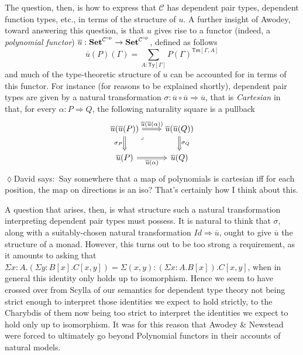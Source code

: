 \documentclass[
  11pt,
  oneside,
  article]{memoir}
\theoremstyle{definition}
\theoremstyle{plain}
\newcommand{\Cat}[1]{\mathbf{#1}}%
\newcommand{\op}{^\tn{op}}
\newcommand{\tn}[1]{\textnormal{#1}}
\newcommand{\smset}{\Cat{Set}}
\newcommand{\0}{\textsf{0}}
\newcommand{\1}{\tn{\textsf{1}}}
\newcommand{\dnote}[1]{{\quad \color{blue}$\lozenge$\;David says:}~#1\;{\color{blue}$\lozenge$}\quad}
\begin{document}
The question, then, is how to express that \(\mathcal{C}\) has dependent
pair types, dependent function types, etc., in terms of the structure of
\(u\). A further insight of Awodey, toward answering this question, is
that \(u\) gives rise to a functor (indeed, a \emph{polynomial functor})
\(\overline{u} : \smset^{\mathcal{C}\op} \to \smset^{\mathcal{C}\op}\),
defined as follows \[
\overline{u}(P)(\Gamma) = \sum_{A : \mathsf{Ty}[\Gamma]} P(\Gamma)^{\mathsf{Tm}[\Gamma, A]}
\] and much of the type-theoretic structure of \(u\) can be accounted
for in terms of this functor. For instance (for reasons to be explained
shortly), dependent pair types are given by a natural transformation
\(\sigma : \overline{u} \circ \overline{u} \Rightarrow \overline{u}\),
that is \emph{Cartesian} in that, for every
\(\alpha : P \Rightarrow Q\), the following naturality square is a
pullback \[
\begin{tikzcd}
    {\overline{u}(\overline{u}(P))} & {\overline{u}(\overline{u}(Q))} \\
    {\overline{u}(P)} & {\overline{u}(Q)}
    \arrow["{\overline{u}(\overline{u}(\alpha))}", Rightarrow, from=1-1, to=1-2]
    \arrow["{\sigma_P}"', Rightarrow, from=1-1, to=2-1]
    \arrow["\lrcorner"{anchor=center, pos=0.125}, draw=none, from=1-1, to=2-2]
    \arrow["{\sigma_Q}", Rightarrow, from=1-2, to=2-2]
    \arrow["{\overline{u}(\alpha)}"', Rightarrow, from=2-1, to=2-2]
\end{tikzcd}
\]
\dnote{Say somewhere that a map of polynomials is cartesian iff for each position, the map on directions is an iso? That's certainly how I think about this.}

A question that arises, then, is what structure such a natural
transformation interpreting dependent pair types must possess. It is
natural to think that \(\sigma\), along with a suitably-chosen natural
transformation \(Id \Rightarrow \overline{u}\), ought to give
\(\overline{u}\) the structure of a monad. However, this turns out to be
too strong a requirement, as it amounts to asking that
\(\Sigma x : A . (\Sigma y : B[x] . C[x,y]) = \Sigma (x,y) : (\Sigma x : A . B[x]) . C[x,y]\),
when in general this identity only holds up to isomorphism. Hence we
seem to have crossed over from Scylla of our semantics for dependent
type theory not being strict enough to interpret those identities we
expect to hold strictly, to the Charybdis of them now being too strict
to interpret the identities we expect to hold only up to isomorphism. It
was for this reason that Awodey \& Newstead were forced to ultimately go
beyond Polynomial functors in their accounts of natural models.
\end{document}
